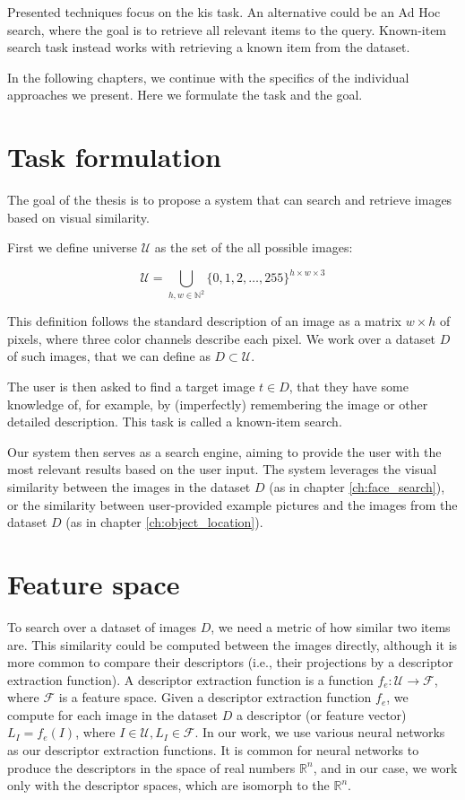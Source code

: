 Presented techniques focus on the \acrlong{kis} task. An alternative could be an Ad Hoc search, where the goal is to retrieve all relevant items to the query. Known-item search task instead works with retrieving a known item from the dataset.

In the following chapters, we continue with the specifics of the individual approaches we present. Here we formulate the task and the goal.


\section{Task formulation}
\label{s:task_formulation_preliminaries}

The goal of the thesis is to propose a system that can search and retrieve images based on visual similarity.  

First we define universe $\mathcal{U}$ as the set of the all possible images:

$$
    \mathcal{U} = \bigcup_{h,w \in \mathbb{N}^2} \{0, 1, 2, \ldots, 255 \}^{h \times w \times 3}
$$

This definition follows the standard description of an image as a matrix $w \times h$ of pixels, where three color channels describe each pixel. We work over a dataset $D$ of such images, that we can define as $D \subset \mathcal{U}$.

The user is then asked to find a target image $t \in D$, that they have some knowledge of, for example, by (imperfectly) remembering the image or other detailed description. This task is called a known-item search.

Our system then serves as a search engine, aiming to provide the user with the most relevant results based on the user input. The system leverages the visual similarity between the images in the dataset $D$ (as in chapter \ref{ch:face_search}), or the similarity between user-provided example pictures and the images from the dataset $D$ (as in chapter \ref{ch:object_location}).

\section{Feature space}

To search over a dataset of images $D$, we need a metric of how similar two items are. This similarity could be computed between the images directly, although it is more common to compare their descriptors (i.e., their projections by a descriptor extraction function). A descriptor extraction function is a function $f_e: \mathcal{U} \rightarrow \mathcal{F}$, where $\mathcal{F}$ is a feature space. Given a descriptor extraction function $f_e$, we compute for each image in the dataset $D$ a descriptor (or feature vector) $L_I = f_e(I)$, where $I \in \mathcal{U}, L_I \in \mathcal{F}$. In our work, we use various neural networks as our descriptor extraction functions. It is common for neural networks to produce the descriptors in the space of real numbers $\mathbb{R}^n$, and in our case, we work only with the descriptor spaces, which are isomorph to the $\mathbb{R}^n$.

